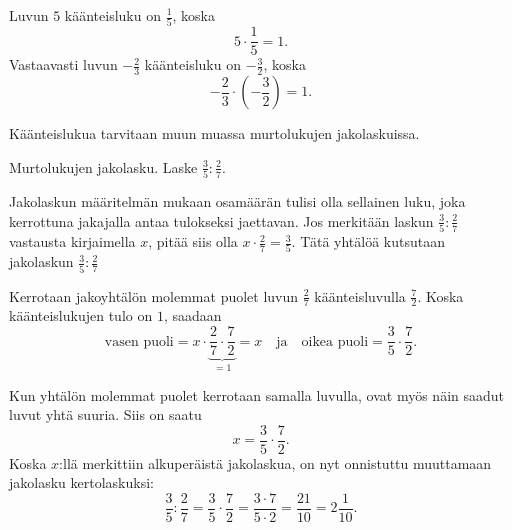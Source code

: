 
 \begin{esimerkki}
	Luvun $5$ käänteisluku on $\frac{1}{5}$, koska
	\[
	 5\cdot \frac{1}{5}=1.
	\]
	Vastaavasti luvun $-\frac{2}{3}$ käänteisluku on $-\frac{3}{2}$, koska
	\[
	 -\frac{2}{3}\cdot (-\frac{3}{2})=1.
	\]
  \end{esimerkki}
  
Käänteislukua tarvitaan muun muassa murtolukujen jakolaskuissa.
 
\begin{esimerkki}
Murtolukujen jakolasku. Laske $\frac 3 5 : \frac 2 7$.

	\begin{esimratk}
Jakolaskun määritelmän mukaan osamäärän tulisi olla sellainen luku, joka kerrottuna jakajalla antaa tulokseksi jaettavan. Jos merkitään laskun $\frac 3 5 : \frac 2 7$ vastausta kirjaimella $x$, pitää siis olla $x \cdot \frac 2 7 = \frac 3 5$.  Tätä yhtälöä kutsutaan jakolaskun $\frac 3 5 : \frac 2 7$ 


Kerrotaan jakoyhtälön molemmat puolet luvun $\frac 2 7$ käänteisluvulla $\frac 7 2$. Koska käänteislukujen tulo on $1$, saadaan
\[
	\text{vasen puoli} = x \cdot \underbrace{\frac 2 7 \cdot \frac 7 2}_{= 1} = x \quad \text{ja} \quad \text{oikea puoli} = \frac 3 5 \cdot \frac 7 2.
\]

Kun yhtälön molemmat puolet kerrotaan samalla luvulla, ovat myös näin saadut luvut yhtä suuria. Siis on saatu
\[
	x = \frac 3 5 \cdot \frac 7 2.
\]
Koska $x$:llä merkittiin alkuperäistä jakolaskua, on nyt onnistuttu muuttamaan jakolasku kertolaskuksi:
\[
	\frac 3 5 : \frac 2 7 = \frac 3 5 \cdot \frac 7 2 = \frac{3 \cdot 7}{5 \cdot 2} = \frac{21}{10} = 2 \frac{1}{10}.
\]
	\end{esimratk}
\end{esimerkki}
 
